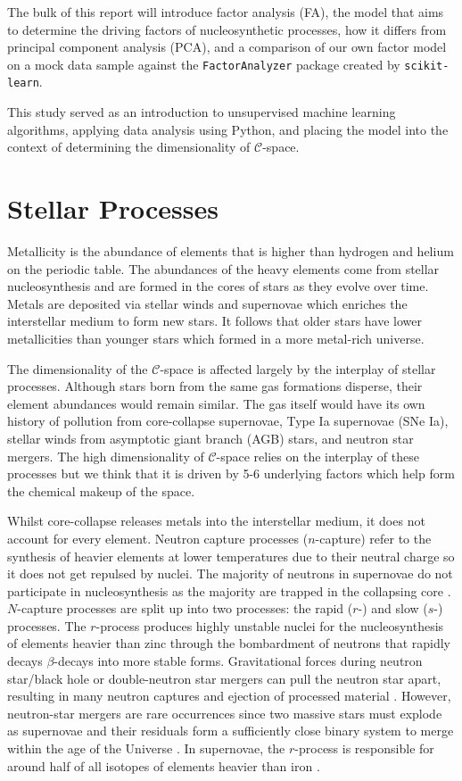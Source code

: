 \documentclass[12pt, letterpaper]{article}
\begin{document}
The bulk of this report will introduce factor analysis (FA), the model that aims to determine the driving factors of nucleosynthetic processes, how it differs from principal component analysis (PCA), and a comparison of our own factor model on a mock data sample against the \texttt{FactorAnalyzer} package created by \texttt{scikit-learn}.


This study served as an introduction to unsupervised machine learning algorithms, applying data analysis using Python, and placing the model into the context of determining the dimensionality of $\mathcal{C}$-space.


\section{Stellar Processes}
Metallicity is the abundance of elements that is higher than hydrogen and helium on the periodic table. The abundances of the heavy elements come from stellar nucleosynthesis and are formed in the cores of stars as they evolve over time. Metals are deposited via stellar winds and supernovae which enriches the interstellar medium to form new stars. It follows that older stars have lower metallicities than younger stars which formed in a more metal-rich universe. 

The dimensionality of the $\mathcal{C}$-space is affected largely by the interplay of stellar processes. Although stars born from the same gas formations disperse, their element abundances would remain similar. The gas itself would have its own history of pollution from core-collapse supernovae, Type Ia supernovae (SNe Ia), stellar winds from asymptotic giant branch (AGB) stars, and neutron star mergers. The high dimensionality of $\mathcal{C}$-space relies on the interplay of these processes but we think that it is driven by 5-6 underlying factors which help form the chemical makeup of the space. 

Whilst core-collapse releases metals into the interstellar medium, it does not account for every element. Neutron capture processes ($n$-capture) refer to the synthesis of heavier elements at lower temperatures due to their neutral charge so it does not get repulsed by nuclei. The majority of neutrons in supernovae do not participate in nucleosynthesis as the majority are trapped in the collapsing core \citep{thompson2001physics}. $N$-capture processes are split up into two processes: the rapid ($r$-) and slow ($s$-) processes. The $r$-process produces highly unstable nuclei for the nucleosynthesis of elements heavier than zinc through the bombardment of neutrons that rapidly decays $\beta$-decays into more stable forms. Gravitational forces during neutron star/black hole or double-neutron star mergers can pull the neutron star apart, resulting in many neutron captures and ejection of processed material \citep{lattimer1977decompression}. However, neutron-star mergers are rare occurrences since two massive stars must explode as supernovae and their residuals form a sufficiently close binary system to merge within the age of the Universe \citep{abbott2017gw170817}. In supernovae, the $r$-process is responsible for around half of all isotopes of elements heavier than iron \citep{qian1998}.
\end{document}
